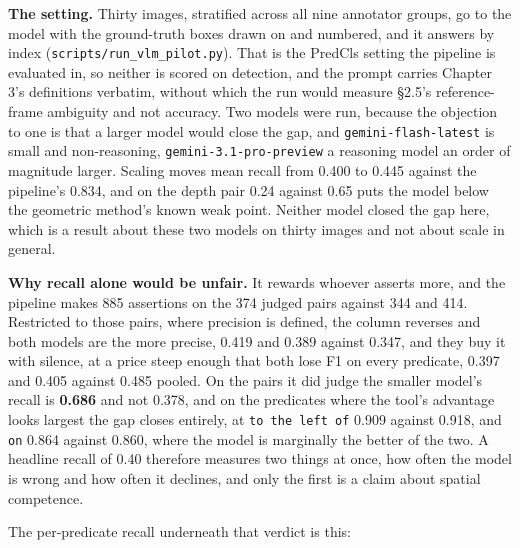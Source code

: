 \textbf{The setting.} Thirty images, stratified across all nine annotator groups, go to the model with the ground-truth boxes drawn on and numbered, and it answers by index (\texttt{scripts/run\_\allowbreak{}vlm\_\allowbreak{}pilot.py}). That is the PredCls setting the pipeline is evaluated in, so neither is scored on detection, and the prompt carries Chapter 3's definitions verbatim, without which the run would measure \S{}2.5's reference-frame ambiguity and not accuracy. Two models were run, because the objection to one is that a larger model would close the gap, and \texttt{gemini-flash-latest} is small and non-reasoning, \texttt{gemini-3.1-pro-preview} a reasoning model an order of magnitude larger. Scaling moves mean recall from 0.400 to 0.445 against the pipeline's 0.834, and on the depth pair 0.24 against 0.65 puts the model below the geometric method's known weak point. Neither model closed the gap here, which is a result about these two models on thirty images and not about scale in general.

\textbf{Why recall alone would be unfair.} It rewards whoever asserts more, and the pipeline makes 885 assertions on the 374 judged pairs against 344 and 414. Restricted to those pairs, where precision is defined, the column reverses and both models are the more precise, 0.419 and 0.389 against 0.347, and they buy it with silence, at a price steep enough that both lose F1 on every predicate, 0.397 and 0.405 against 0.485 pooled. On the pairs it did judge the smaller model's recall is \textbf{0.686} and not 0.378, and on the predicates where the tool's advantage looks largest the gap closes entirely, at \texttt{to the left of} 0.909 against 0.918, and \texttt{on} 0.864 against 0.860, where the model is marginally the better of the two. A headline recall of 0.40 therefore measures two things at once, how often the model is wrong and how often it declines, and only the first is a claim about spatial competence.

The per-predicate recall underneath that verdict is this:

